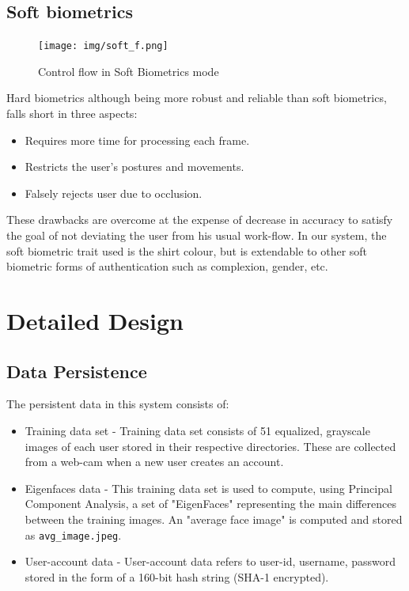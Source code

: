 \documentclass[12pt]{article}			%
\begin{document}
\subsection{Soft biometrics}
\begin{figure}[h!]
	\centering
	\texttt{[image: img/soft\_f.png]}
	\caption{Control flow in Soft Biometrics mode}
	\label{fig:cfsb}
\end{figure}
Hard biometrics although being more robust and reliable than soft biometrics, falls short in three aspects\cite{Niin10}:
\begin{itemize}
	\item Requires more time for processing each frame.
	\item Restricts the user's postures and movements.
	\item Falsely rejects user due to occlusion.
\end{itemize}
These drawbacks are overcome at the expense of decrease in accuracy to satisfy the goal of not deviating the user from his usual work-flow. 
In our system, the soft biometric trait used is the shirt colour, but is extendable to other soft biometric forms of authentication such as complexion, gender\cite{Jain204}, etc. 


\section{ Detailed Design }
\subsection{ Data Persistence }
The persistent data in this system consists of:
\begin{itemize}
\item Training data set - Training data set consists of 51 equalized, grayscale images of each user stored in their respective directories. These are collected from a web-cam when a new user creates an account.%
\item Eigenfaces data - This training data set is used to compute, using Principal Component Analysis, a set of "EigenFaces" representing the main differences between the training images. An "average face image" is computed and stored as \verb+avg_image.jpeg+. 
\item User-account data - User-account data refers to user-id, username, password stored in the form of a 160-bit hash string (SHA-1 encrypted).
\end{itemize}
\end{document}
